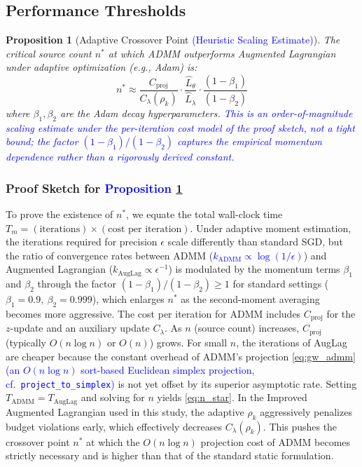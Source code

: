 \documentclass[preprint,12pt,authoryear]{elsarticle}
\newtheorem{proposition}[theorem]{Proposition}
\begin{document}
\subsection{Performance Thresholds}

\begin{proposition}[Adaptive Crossover Point \textcolor{blue}{(Heuristic Scaling Estimate)}]\label{thm:crossover}
The critical source count $n^*$ at which ADMM outperforms Augmented Lagrangian under adaptive optimization (e.g., Adam) is:
\begin{equation}
\label{eq:n_star}
n^* \approx \frac{C_{\text{proj}}}{C_\lambda(\rho_k)} \cdot \frac{\hat{L}_\theta}{\hat{L}_\lambda} \cdot \frac{(1-\beta_1)}{(1-\beta_2)}
\end{equation}
where $\beta_1, \beta_2$ are the Adam decay hyperparameters. \textcolor{blue}{This is an order-of-magnitude scaling estimate under the per-iteration cost model of the proof sketch, not a tight bound; the factor $(1-\beta_1)/(1-\beta_2)$ captures the empirical momentum dependence rather than a rigorously derived constant.}
\end{proposition}

\subsubsection{Proof Sketch for \textcolor{blue}{Proposition} \ref{thm:crossover}}
To prove the existence of $n^*$, we equate the total wall-clock time $T_m = (\text{iterations}) \times (\text{cost per iteration})$. 
Under adaptive moment estimation, the iterations required for precision $\epsilon$ scale differently than standard SGD, but the ratio of convergence rates between ADMM (\textcolor{blue}{$k_{\text{ADMM}} \propto \log(1/\epsilon)$}) and Augmented Lagrangian ($k_{\text{AugLag}} \propto \epsilon^{-1}$) is modulated by the momentum terms $\beta_1$ and $\beta_2$ through the factor $(1-\beta_1)/(1-\beta_2) \geq 1$ for standard settings ($\beta_1=0.9,\ \beta_2=0.999$), which enlarges $n^*$ as the second-moment averaging becomes more aggressive.
The cost per iteration for ADMM includes $C_{\text{proj}}$ for the $z$-update and an auxiliary update $C_\lambda$. 
As $n$ (source count) increases, $C_{\text{proj}}$ (typically $O(n \log n)$ or $O(n)$) grows. For small $n$, the iterations of AugLag are cheaper because the constant overhead of ADMM's projection \eqref{eq:gw_admm} \textcolor{blue}{(an $O(n\log n)$ sort-based Euclidean simplex projection, cf.\ \texttt{project\_to\_simplex})} is not yet offset by its superior asymptotic rate. Setting $T_{\text{ADMM}} = T_{\text{AugLag}}$ and solving for $n$ yields \eqref{eq:n_star}. In the Improved Augmented Lagrangian used in this study, the adaptive $\rho_k$ aggressively penalizes budget violations early, which effectively decreases $C_\lambda(\rho_k)$. This pushes the crossover point $n^*$ at which the $O(n \log n)$ projection cost of ADMM becomes strictly necessary and is higher than that of the standard static formulation.
\end{document}
